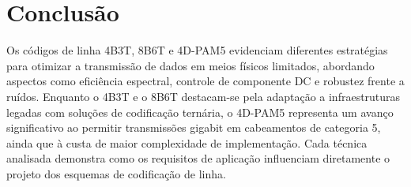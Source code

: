 \documentclass[conference]{IEEEtran}
\begin{document}
\section{Conclusão}

Os códigos de linha 4B3T, 8B6T e 4D-PAM5 evidenciam diferentes estratégias para otimizar a transmissão de dados em meios físicos limitados, abordando aspectos como eficiência espectral, controle de componente DC e robustez frente a ruídos. Enquanto o 4B3T e o 8B6T destacam-se pela adaptação a infraestruturas legadas com soluções de codificação ternária, o 4D-PAM5 representa um avanço significativo ao permitir transmissões gigabit em cabeamentos de categoria 5, ainda que à custa de maior complexidade de implementação. Cada técnica analisada demonstra como os requisitos de aplicação influenciam diretamente o projeto dos esquemas de codificação de linha.
\end{document}

